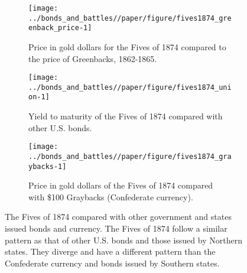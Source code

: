 \begin{figure}[!]
  \begin{subfigure}[b]{0.45\linewidth}
    \texttt{[image: ../bonds\_and\_battles//paper/figure/fives1874\_greenback\_price-1]}
  \caption{Price in gold dollars for the Fives of 1874 compared to the price of Greenbacks, 1862-1865.}
  \label{bonds:fig:fives1874_greenbacks}
\end{subfigure}%
\hspace{0.1\linewidth}%
\begin{subfigure}[b]{0.45\linewidth}
    \texttt{[image: ../bonds\_and\_battles//paper/figure/fives1874\_union-1]}
    \caption{Yield to maturity of the Fives of 1874 compared with other U.S. bonds.}
  \label{bonds:fig:fives1874_union}
\end{subfigure}


\begin{subfigure}[b]{0.45\linewidth}
  \texttt{[image: ../bonds\_and\_battles//paper/figure/fives1874\_graybacks-1]}
\caption{Price in gold dollars of the Fives of 1874 compared with \$100 Graybacks (Confederate currency).}
\label{bonds:fig:fives1874_grayback}
\end{subfigure}
\caption[The Fives of 1874 compared with other government and states issued bonds and currency.]{The Fives of 1874 compared with other government and states issued bonds and currency.
  The Fives of 1874 follow a similar pattern as that of other U.S. bonds and those issued by Northern states.
  They diverge and have a different pattern than the Confederate currency and bonds issued by Southern states.
}
\label{bonds:fig:fives1874_compared}
\end{figure}



